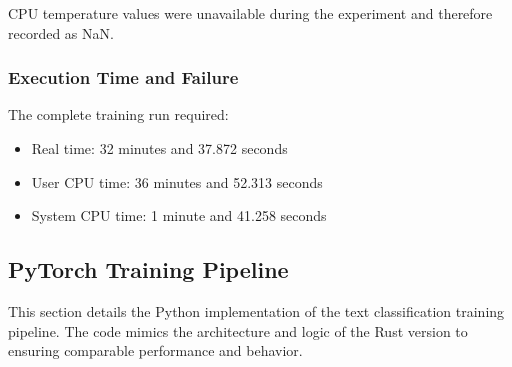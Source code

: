 \documentclass{ieeeaccess}
\begin{document}
CPU temperature values were unavailable during the experiment and therefore recorded as NaN.

\subsubsection{Execution Time and Failure}

The complete training run required:

\begin{itemize}
    \item Real time: 32 minutes and 37.872 seconds
    \item User CPU time: 36 minutes and 52.313 seconds
    \item System CPU time: 1 minute and 41.258 seconds
\end{itemize}

\subsection{PyTorch Training Pipeline}
This section details the Python implementation of the text classification training pipeline. The code mimics the architecture and logic of the Rust version to ensuring comparable performance and behavior.
\end{document}

